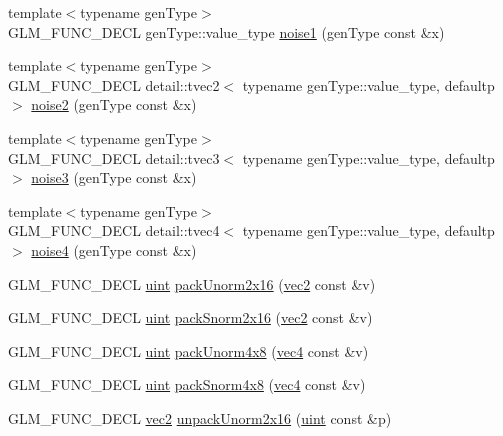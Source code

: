 \begin{CompactItemize}
{\footnotesize template$<$typename genType$>$ }\\GLM\_\-FUNC\_\-DECL genType::value\_\-type \hyperlink{group__core__func__noise_g678a5c0934a5bebef68e27dcd2c0b17f}{noise1} (genType const \&x)
\item 
{\footnotesize template$<$typename genType$>$ }\\GLM\_\-FUNC\_\-DECL detail::tvec2$<$ typename genType::value\_\-type, defaultp $>$ \hyperlink{group__core__func__noise_gb56ac2b6d1f0353dab3119c1d741f319}{noise2} (genType const \&x)
\item 
{\footnotesize template$<$typename genType$>$ }\\GLM\_\-FUNC\_\-DECL detail::tvec3$<$ typename genType::value\_\-type, defaultp $>$ \hyperlink{group__core__func__noise_gbdb9942a4dae6ea82bf5a801aa376979}{noise3} (genType const \&x)
\item 
{\footnotesize template$<$typename genType$>$ }\\GLM\_\-FUNC\_\-DECL detail::tvec4$<$ typename genType::value\_\-type, defaultp $>$ \hyperlink{group__core__func__noise_g1b0e265d42fa1abacdf1980959d80f78}{noise4} (genType const \&x)
\item 
GLM\_\-FUNC\_\-DECL \hyperlink{group__core__precision_g4fd29415871152bfb5abd588334147c8}{uint} \hyperlink{group__core__func__packing_g0659ddaf09727551c7bf51655d2a65cf}{packUnorm2x16} (\hyperlink{group__core__types_ga1618f51db67eaa145db101d8c8431d8}{vec2} const \&v)
\item 
GLM\_\-FUNC\_\-DECL \hyperlink{group__core__precision_g4fd29415871152bfb5abd588334147c8}{uint} \hyperlink{group__core__func__packing_g0c8005de240d6c4ca3d16c7bee25c622}{packSnorm2x16} (\hyperlink{group__core__types_ga1618f51db67eaa145db101d8c8431d8}{vec2} const \&v)
\item 
GLM\_\-FUNC\_\-DECL \hyperlink{group__core__precision_g4fd29415871152bfb5abd588334147c8}{uint} \hyperlink{group__core__func__packing_g834ee9a9e73dcb0a7c1fc88143f3edb8}{packUnorm4x8} (\hyperlink{group__core__types_g5881b1b022d7fd1b7218f5916532dd02}{vec4} const \&v)
\item 
GLM\_\-FUNC\_\-DECL \hyperlink{group__core__precision_g4fd29415871152bfb5abd588334147c8}{uint} \hyperlink{group__core__func__packing_gfcf25acc0d361c6c696a433aa5dfd16b}{packSnorm4x8} (\hyperlink{group__core__types_g5881b1b022d7fd1b7218f5916532dd02}{vec4} const \&v)
\item 
GLM\_\-FUNC\_\-DECL \hyperlink{group__core__types_ga1618f51db67eaa145db101d8c8431d8}{vec2} \hyperlink{group__core__func__packing_gff327a2fca8abfe31b74b914b68ac5ec}{unpackUnorm2x16} (\hyperlink{group__core__precision_g4fd29415871152bfb5abd588334147c8}{uint} const \&p)

\end{CompactItemize}
